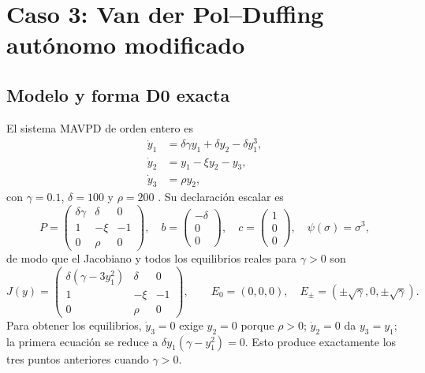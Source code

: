 \section[Caso 3: Van der Pol--Duffing modificado]
{Caso 3: Van der Pol--Duffing autónomo modificado}

\subsection{Modelo y forma D0 exacta}

El sistema MAVPD de orden entero es
\begin{align}
 \dot y_1&=\delta\gamma y_1+\delta y_2-\delta y_1^3,\nonumber\\
 \dot y_2&=y_1-\xi y_2-y_3,\label{int:eq:mavpd}\\
 \dot y_3&=\rho y_2,\nonumber
\end{align}
con \(\gamma=0.1\), \(\delta=100\) y \(\rho=200\)
\cite{matouk2023}. Su declaración escalar es
\[
 P=\begin{pmatrix}
 \delta\gamma&\delta&0\\
 1&-\xi&-1\\
 0&\rho&0
 \end{pmatrix},\quad
 b=\begin{pmatrix}-\delta\\0\\0\end{pmatrix},\quad
 c=\begin{pmatrix}1\\0\\0\end{pmatrix},\quad
 \psi(\sigma)=\sigma^3,
\]
de modo que el Jacobiano y todos los equilibrios reales para \(\gamma>0\) son
\begin{equation}
 J(y)=\begin{pmatrix}
 \delta(\gamma-3y_1^2)&\delta&0\\
 1&-\xi&-1\\
 0&\rho&0
 \end{pmatrix},\qquad
 E_0=(0,0,0),\quad
 E_\pm=(\pm\sqrt{\gamma},0,\pm\sqrt{\gamma}).
 \label{int:eq:mavpd-jacobian}
\end{equation}
Para obtener los equilibrios, \(\dot y_3=0\) exige \(y_2=0\) porque
\(\rho>0\); \(\dot y_2=0\) da \(y_3=y_1\); la primera ecuación se reduce
a \(\delta y_1(\gamma-y_1^2)=0\). Esto produce exactamente los tres puntos
anteriores cuando \(\gamma>0\).

